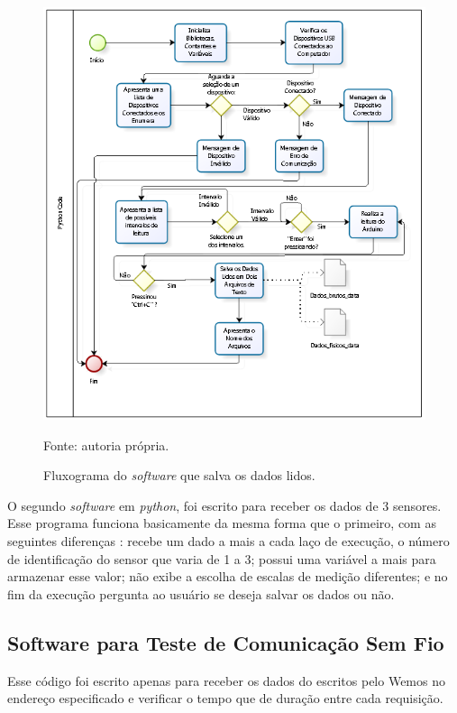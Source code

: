 		\begin{figure}[h]
			\centering
			\includegraphics[keepaspectratio=true,scale=1]{figuras/diagrama_python.PNG}
			\caption{Fluxograma do \textit{software} que salva os dados lidos. }
			Fonte: autoria própria. 
			\label{fluxograma_python}	
		\end{figure}
		
		O segundo \textit{software} em \textit{python}, foi escrito para receber os dados de 3 sensores. Esse programa funciona basicamente da mesma forma que o primeiro, com as seguintes  diferenças :  recebe um dado a mais a cada laço de execução, o número de identificação do sensor que varia de 1 a 3; possui uma variável a mais para  armazenar esse valor; não exibe a escolha de escalas de medição diferentes; e no fim da execução pergunta ao usuário se deseja salvar os dados ou não.

\subsection{Software para Teste de Comunicação Sem Fio}

	Esse código foi escrito apenas para receber os dados do escritos pelo Wemos no endereço especificado e verificar o tempo que de duração entre cada requisição.
	
